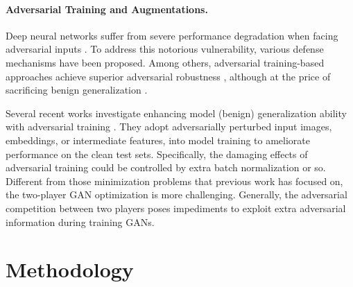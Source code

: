 \documentclass{article}
\begin{document}
\vspace{-1mm}
\paragraph{Adversarial Training and Augmentations.} Deep neural networks suffer from severe performance degradation \cite{szegedy2013intriguing,goodfellow2014explaining} when facing adversarial inputs \cite{goodfellow2014explaining, kurakin2016adversarial, madry2017towards}. To address this notorious vulnerability, various defense mechanisms \cite{zhang2019theoretically,schmidt2018adversarially,sun2019towards,nakkiran2019adversarial,stutz2019disentangling,raghunathan2019adversarial,jiang2020robust,wang2020once,hu2020triple,chen2020adversarial} have been proposed. Among others, adversarial training-based approaches achieve superior adversarial robustness \cite{goodfellow2014explaining, kurakin2016adversarial, madry2017towards}, although at the price of sacrificing benign generalization \cite{tsipras2018robustness,zhang2019theoretically,schmidt2018adversarially,sun2019towards,nakkiran2019adversarial,stutz2019disentangling,raghunathan2019adversarial}.

Several recent works investigate enhancing model (benign) generalization ability with adversarial training \cite{xie2020adversarial,zhu2019freelb,wang2019improving,gan2020large,wei2019improved,chen2021alfa}. They adopt adversarially perturbed input images, embeddings, or intermediate features, into model training to ameliorate performance on the clean test sets. Specifically, the damaging effects of adversarial training could be controlled by extra batch normalization \cite{xie2020adversarial} or so. Different from those minimization problems that previous work has focused on, the two-player GAN optimization is more challenging. Generally, the adversarial competition between two players poses impediments to exploit extra adversarial information during training GANs.

\vspace{-0.5em}
\section{Methodology}
\vspace{-0.5em}
\end{document}
